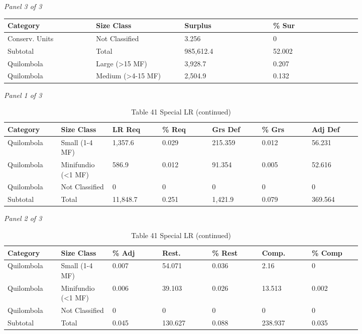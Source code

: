 \documentclass[12pt]{article}
\begin{document}
\begin{landscape}
\begin{table}[H]
\vspace{0.6em}

\textit{Panel 3 of 3}\\[2pt]
{\fontsize{12}{14}\selectfont
\setlength{\tabcolsep}{3pt}
\renewcommand{\arraystretch}{1.08}
\begin{tabular}{p{0.205\linewidth}p{0.205\linewidth}p{0.205\linewidth}p{0.205\linewidth}}
\toprule
Category & Size Class & Surplus & \% Sur \\
\midrule
Conserv. Units & Not Classified & 3.256 & 0 \\
Subtotal & Total & 985,612.4 & 52.002 \\
Quilombola & Large (>15 MF) & 3,928.7 & 0.207 \\
Quilombola & Medium (>4-15 MF) & 2,504.9 & 0.132 \\
\bottomrule
\end{tabular}
}
\end{table}
\begin{table}[H]
\centering
\caption{Table 41 Special LR (continued)}
\textit{Panel 1 of 3}\\[2pt]
{\fontsize{12}{14}\selectfont
\setlength{\tabcolsep}{3pt}
\renewcommand{\arraystretch}{1.08}
\begin{tabular}{p{0.117\linewidth}p{0.117\linewidth}p{0.117\linewidth}p{0.117\linewidth}p{0.117\linewidth}p{0.117\linewidth}p{0.117\linewidth}}
\toprule
Category & Size Class & LR Req & \% Req & Grs Def & \% Grs & Adj Def \\
\midrule
Quilombola & Small (1-4 MF) & 1,357.6 & 0.029 & 215.359 & 0.012 & 56.231 \\
Quilombola & Minifundio (<1 MF) & 586.9 & 0.012 & 91.354 & 0.005 & 52.616 \\
Quilombola & Not Classified & 0 & 0 & 0 & 0 & 0 \\
Subtotal & Total & 11,848.7 & 0.251 & 1,421.9 & 0.079 & 369.564 \\
\bottomrule
\end{tabular}
}

\vspace{0.6em}

\textit{Panel 2 of 3}\\[2pt]
{\fontsize{12}{14}\selectfont
\setlength{\tabcolsep}{3pt}
\renewcommand{\arraystretch}{1.08}
\begin{tabular}{p{0.117\linewidth}p{0.117\linewidth}p{0.117\linewidth}p{0.117\linewidth}p{0.117\linewidth}p{0.117\linewidth}p{0.117\linewidth}}
\toprule
Category & Size Class & \% Adj & Rest. & \% Rest & Comp. & \% Comp \\
\midrule
Quilombola & Small (1-4 MF) & 0.007 & 54.071 & 0.036 & 2.16 & 0 \\
Quilombola & Minifundio (<1 MF) & 0.006 & 39.103 & 0.026 & 13.513 & 0.002 \\
Quilombola & Not Classified & 0 & 0 & 0 & 0 & 0 \\
Subtotal & Total & 0.045 & 130.627 & 0.088 & 238.937 & 0.035 \\
\bottomrule
\end{tabular}
}


\end{table}
\end{landscape}
\end{document}
